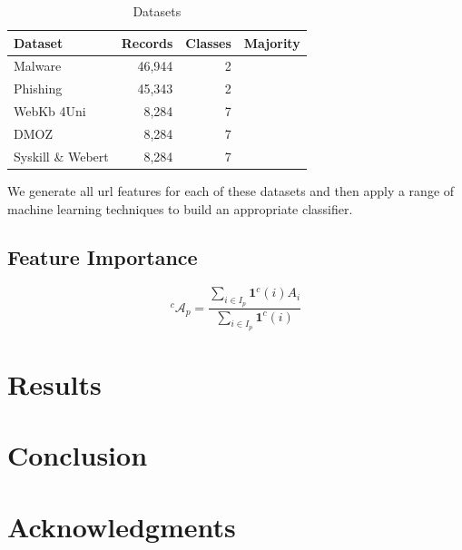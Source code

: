 \documentclass[sigconf]{acmart}
\begin{document}
\begin{table}
\caption{Datasets}
\label{tab:data}
\begin{tabular}{|l|r|r|r|}
\toprule
Dataset              &Records        &Classes  &Majority    \\
\midrule
Malware              &46,944          &2       &            \\
Phishing             &45,343          &2       &            \\
WebKb 4Uni           &8,284           &7       &            \\
DMOZ                 &8,284           &7       &            \\
Syskill \& Webert     &8,284           &7       &            \\
\bottomrule
\end{tabular}
\end{table}

We generate all url features for each of these datasets and then apply a range of machine learning
techniques to build an appropriate classifier. 

\subsection{Feature Importance}

\begin{equation}
\label{campaign_baseline}
{}^c\mathcal{A}_p =  \frac{ \sum_{i \in I_p} \mathbf{1}^c(i) A_i }{ \sum_{i \in I_p} \mathbf{1}^c(i) }
\end{equation}


\section{Results}


\section{Conclusion}

\section{Acknowledgments}



\end{document}

